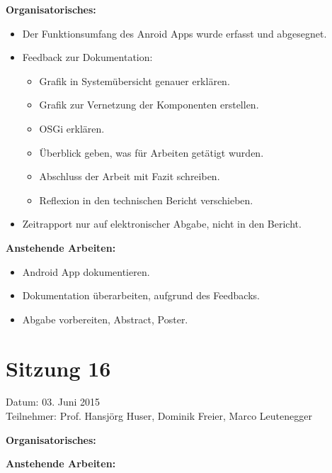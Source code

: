 	\textbf{Organisatorisches:}
	\begin{itemize}
		\item Der Funktionsumfang des Anroid Apps wurde erfasst und abgesegnet.
		\item Feedback zur Dokumentation:
		\begin{itemize}
			\item Grafik in Systemübersicht genauer erklären.
			\item Grafik zur Vernetzung der Komponenten erstellen.
			\item OSGi erklären.
			\item Überblick geben, was für Arbeiten getätigt wurden.
			\item Abschluss der Arbeit mit Fazit schreiben.
			\item Reflexion in den technischen Bericht verschieben.
		\end{itemize}
		\item Zeitrapport nur auf elektronischer Abgabe, nicht in den Bericht.
	\end{itemize}

	\textbf{Anstehende Arbeiten:}
	\begin{itemize}
		\item Android App dokumentieren.
		\item Dokumentation überarbeiten, aufgrund des Feedbacks.
		\item Abgabe vorbereiten, Abstract, Poster.
	\end{itemize}

\section*{Sitzung 16}
	Datum: 03. Juni 2015 \\
	Teilnehmer: Prof. Hansjörg Huser, Dominik Freier, Marco Leutenegger

	\textbf{Organisatorisches:}

	\textbf{Anstehende Arbeiten:}